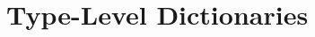 \newcommand{\framedhslinecorrect}[2]%
  {#1[#2]}

\newcommand{\framedhs}{\sethscode{framedhscode}}


\newenvironment{inlinehscode}%
  {\(\def\column##1##2{}%
   \let\>\undefined\let\<\undefined\let\\\undefined
   \newcommand\>[1][]{}\newcommand\<[1][]{}\newcommand\\[1][]{}%
   \def\fromto##1##2##3{##3}%
   \def\nextline{}}{\) }%

\newcommand{\inlinehs}{\sethscode{inlinehscode}}


\newenvironment{joincode}%
  {\let\orighscode=\hscode
   \let\origendhscode=\endhscode
   \def\endhscode{\def\hscode{\endgroup\def\@currenvir{hscode}\\}\begingroup}
   \orighscode\def\hscode{\endgroup\def\@currenvir{hscode}}}%
  {\origendhscode
   \global\let\hscode=\orighscode
   \global\let\endhscode=\origendhscode}%

\makeatother
\EndFmtInput
%

%
\makeatletter

\let\Varid\mathit
\let\Conid\mathsf

\def\commentbegin{\quad\{\ }
\def\commentend{\}}

\newcommand{\ty}[1]{\Conid{#1}}
\newcommand{\con}[1]{\Conid{#1}}
\newcommand{\id}[1]{\Varid{#1}}
\newcommand{\cl}[1]{\Varid{#1}}
\newcommand{\opsym}[1]{\mathrel{#1}}

\newcommand\Keyword[1]{\textbf{\textsf{#1}}}
\newcommand\Hide{\mathbin{\downarrow}}
\newcommand\Reveal{\mathbin{\uparrow}}




\makeatother
\EndFmtInput

\section{Type-Level Dictionaries}
\label{sec:type-level-dict}

